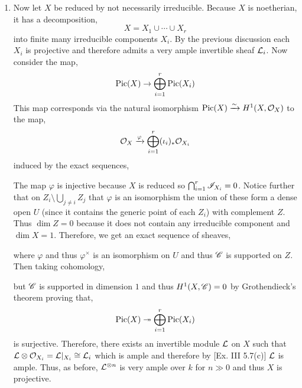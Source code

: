 \documentclass[12pt]{article}
\begin{document}
\begin{enumerate}
\item Now let $X$ be reduced by not necessarily irreducible. Because $X$ is noetherian, it has a decomposition,
\[ X = X_1 \cup \cdots \cup X_r \]
into finite many irreducible components $X_i$. By the previous discussion each $X_i$ is projective and therefore admits a very ample invertible sheaf $\mathcal{L}_i$. Now consider the map,
\[ \mathrm{Pic}(X) \to \bigoplus_{i = 1}^r \mathrm{Pic}(X_i) \]
This map corresponds via the natural isomorphism $\mathrm{Pic}(X) \xrightarrow{\sim} H^1(X, \mathcal{O}_{X})$ to the map,
\[ \mathcal{O}_{X} \xrightarrow{\varphi} \bigoplus_{i = 1}^r (\iota_i)_* \mathcal{O}_{X_i} \]
induced by the exact sequences,
\begin{center}
\end{center}
The map $\varphi$ is injective because $X$ is reduced so $\bigcap_{i = 1}^r \mathscr{I}_{X_i} = 0$. Notice further that on $Z_i \setminus \bigcup_{j \neq i} Z_j$ that $\varphi$ is an isomorphism the union of these form a dense open $U$ (since it contains the generic point of each $Z_i$) with complement $Z$. Thus $\dim{Z} = 0$ because it does not contain any irreducible component and $\dim{X} = 1$. Therefore, we get an exact sequence of sheaves,
\begin{center}
\end{center}
where $\varphi$ and thus $\varphi^\times$ is an isomorphism on $U$ and thus $\mathscr{C}$ is supported on $Z$. Then taking cohomology,
\begin{center}
\end{center}
but $\mathscr{C}$ is supported in dimension $1$ and thus $H^1(X, \mathscr{C}) = 0$ by Grothendieck's theorem proving that,
\[ \mathrm{Pic}(X) \twoheadrightarrow \bigoplus_{i = 1}^r \mathrm{Pic}(X_i) \]
is surjective. Therefore, there exists an invertible module $\mathcal{L}$ on $X$ such that $\mathcal{L} \otimes \mathcal{O}_{X_i} = \mathcal{L}|_{X_i} \cong \mathcal{L}_i$ which is ample and therefore by [Ex. III 5.7(c)] $\mathcal{L}$ is ample. Thus, as before, $\mathcal{L}^{\otimes n}$ is very ample over $k$ for $n \gg 0$ and thus $X$ is projective.


\end{enumerate}
\end{document}
